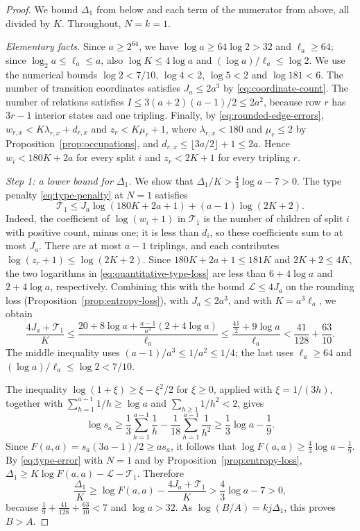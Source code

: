 \begin{proof}
We bound \(\Delta_1\) from below and each term of the numerator from
above, all divided by \(K\). Throughout, \(N=k=1\).

\emph{Elementary facts.} Since \(a\ge2^{64}\), we have
\(\log a\ge64\log2>32\) and \(\ell_a\ge64\); since
\(\log_2a\le\ell_a\le a\), also \(\log K\le4\log a\) and
\((\log a)/\ell_a\le\log2\). We use the numerical bounds
\(\log2<7/10\), \(\log4<2\), \(\log5<2\) and \(\log181<6\). The number
of transition coordinates satisfies \(J_a\le2a^3\) by
\eqref{eq:coordinate-count}. The number of relations satisfies
\(I\le3(a+2)(a-1)/2\le2a^2\), because row \(r\) has \(3r-1\) interior
states and one tripling. Finally, by \eqref{eq:rounded-edge-errors},
\(w_{r,x}<K\lambda_{r,x}+d_{r,x}\) and \(z_r<K\mu_r+1\), where
\(\lambda_{r,x}<180\) and \(\mu_r\le2\) by
Proposition~\ref{prop:occupations}, and
\(d_{r,x}\le\lfloor3a/2\rfloor+1\le2a\). Hence \(w_i<180K+2a\) for
every split \(i\) and \(z_r<2K+1\) for every tripling \(r\).

\emph{Step 1: a lower bound for \(\Delta_1\).} We show that
\(\Delta_1/K>\frac43\log a-7>0\). The type penalty
\eqref{eq:type-penalty} at \(N=1\) satisfies
\begin{equation}\label{eq:quantitative-type-loss}
 \mathcal T_1\le J_a\log(180K+2a+1)+(a-1)\log(2K+2).
\end{equation}
Indeed, the coefficient of \(\log(w_i+1)\) in \(\mathcal T_1\) is the
number of children of split \(i\) with positive count, minus one; it is
less than \(d_i\), so these coefficients sum to at most \(J_a\). There
are at most \(a-1\) triplings, and each contributes
\(\log(z_r+1)\le\log(2K+2)\). Since \(180K+2a+1\le181K\) and
\(2K+2\le4K\), the two logarithms in \eqref{eq:quantitative-type-loss}
are less than \(6+4\log a\) and \(2+4\log a\), respectively. Combining
this with the bound \(\mathcal L\le4J_a\) on the rounding loss
(Proposition~\ref{prop:entropy-loss}), with \(J_a\le2a^3\), and with
\(K=a^3\ell_a\), we obtain
\[
 \frac{4J_a+\mathcal T_1}{K}
 \le\frac{20+8\log a+\frac{a-1}{a^3}(2+4\log a)}{\ell_a}
 \le\frac{\frac{41}2+9\log a}{\ell_a}
 <\frac{41}{128}+\frac{63}{10}.
\]
The middle inequality uses \((a-1)/a^3\le1/a^2\le1/4\); the last uses
\(\ell_a\ge64\) and \((\log a)/\ell_a\le\log2<7/10\).

The inequality
\(\log(1+\xi)\ge\xi-\xi^2/2\) for \(\xi\ge0\), applied with
\(\xi=1/(3h)\), together with \(\sum_{h=1}^{a-1}1/h\ge\log a\) and
\(\sum_{h\ge1}1/h^2<2\), gives
\[
 \log s_a
 \ge\frac13\sum_{h=1}^{a-1}\frac1h
     -\frac1{18}\sum_{h=1}^{a-1}\frac1{h^2}
 \ge\frac13\log a-\frac19.
\]
Since \(F(a,a)=s_a(3a-1)/2\ge as_a\), it follows that
\(\log F(a,a)\ge\frac43\log a-\frac19\). By \eqref{eq:type-error} with
\(N=1\) and by Proposition~\ref{prop:entropy-loss},
\(\Delta_1\ge K\log F(a,a)-\mathcal L-\mathcal T_1\). Therefore
\begin{equation}\label{eq:quantitative-contraction}
 \frac{\Delta_1}{K}
 \ge\log F(a,a)-\frac{4J_a+\mathcal T_1}{K}
 >\frac43\log a-7>0,
\end{equation}
because \(\frac19+\frac{41}{128}+\frac{63}{10}<7\) and \(\log a>32\).
As \(\log(B/A)=kj\Delta_1\), this proves \(B>A\).


\end{proof}
